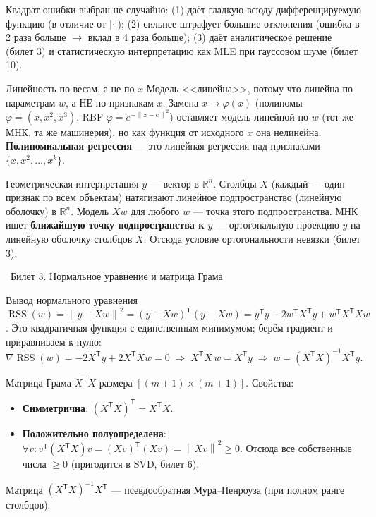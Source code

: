\documentclass[12pt, a4paper]{article}
\newcommand{\bilet}[2]{%
  \vspace{10pt}%
  \noindent\colorbox{qcolor}{\parbox{\dimexpr\linewidth-2\fboxsep\relax}{%
    \color{white}\large\bfseries\strut\ Билет #1. #2%
  }}%
  \nopagebreak\vspace{5pt}\par\nopagebreak%
}
\newcommand{\R}{\mathbb{R}}
\newcommand{\RSS}{\operatorname{RSS}}
\newcommand{\tr}{^{\mathsf{T}}}
\newcommand{\norm}[1]{\left\lVert #1 \right\rVert}
\begin{document}
Квадрат ошибки выбран не случайно: (1) даёт гладкую всюду дифференцируемую функцию (в отличие от $|\cdot|$); (2) сильнее штрафует большие отклонения (ошибка в 2 раза больше $\to$ вклад в 4 раза больше); (3) даёт аналитическое решение (билет 3) и статистическую интерпретацию как MLE при гауссовом шуме (билет 10).

\begin{propbox}{Линейность по весам, а не по $x$}
Модель <<линейна>>, потому что линейна по параметрам $w$, а НЕ по признакам $x$. Замена $x \to \varphi(x)$ (полиномы $\varphi = (x, x^2, x^3)$, RBF $\varphi = e^{-\norm{x-c}^2}$) оставляет модель линейной по $w$ (тот же МНК, та же машинерия), но как функция от исходного $x$ она нелинейна. \textbf{Полиномиальная регрессия} --- это линейная регрессия над признаками $\{x, x^2, \ldots, x^k\}$.
\end{propbox}

\begin{propbox}{Геометрическая интерпретация}
$y$ --- вектор в $\R^n$. Столбцы $X$ (каждый --- один признак по всем объектам) натягивают линейное подпространство (линейную оболочку) в $\R^n$. Модель $Xw$ для любого $w$ --- точка этого подпространства. МНК ищет \textbf{ближайшую точку подпространства к $y$} --- ортогональную проекцию $y$ на линейную оболочку столбцов $X$. Отсюда условие ортогональности невязки (билет 3).
\end{propbox}

\bilet{3}{Нормальное уравнение и матрица Грама}

\begin{proofbox}{Вывод нормального уравнения}
$\RSS(w) = \norm{y - Xw}^2 = (y - Xw)\tr(y - Xw) = y\tr y - 2 w\tr X\tr y + w\tr X\tr X w$. Это квадратичная функция с единственным минимумом; берём градиент и приравниваем к нулю:
\[
  \nabla \RSS(w) = -2 X\tr y + 2 X\tr X w = 0 \;\Longrightarrow\; \boxed{X\tr X\, w = X\tr y} \;\Longrightarrow\; w = (X\tr X)^{-1} X\tr y.
\]
\end{proofbox}

\begin{defbox}{Матрица Грама}
$X\tr X$ размера $[(m{+}1)\times(m{+}1)]$. Свойства:
\begin{itemize}
  \item \textbf{Симметрична}: $(X\tr X)\tr = X\tr X$.
  \item \textbf{Положительно полуопределена}: $\forall v\colon v\tr(X\tr X)v = (Xv)\tr(Xv) = \norm{Xv}^2 \ge 0$. Отсюда все собственные числа $\ge 0$ (пригодится в SVD, билет 6).
\end{itemize}
Матрица $(X\tr X)^{-1}X\tr$ --- псевдообратная Мура--Пенроуза (при полном ранге столбцов).
\end{defbox}
\end{document}
